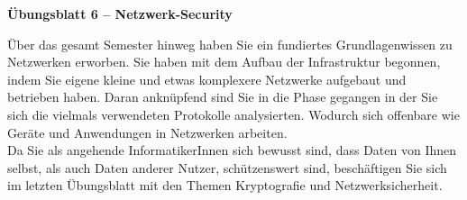 \documentclass[paper=a4,fontsize=11pt]{scrartcl}%
\begin{document}
\begin{center}
\Large{\textbf{Übungsblatt 6 -- Netzwerk-Security}}
\end{center}
Über das gesamt Semester hinweg haben Sie ein fundiertes Grundlagenwissen zu Netzwerken erworben. Sie haben mit dem Aufbau der Infrastruktur begonnen, indem Sie eigene kleine und etwas komplexere Netzwerke aufgebaut und betrieben haben. Daran anknüpfend sind Sie in die Phase gegangen in der Sie sich die vielmals verwendeten Protokolle analysierten. Wodurch sich offenbare wie Geräte und Anwendungen in Netzwerken arbeiten.\\
Da Sie als angehende InformatikerInnen sich bewusst sind, dass Daten von Ihnen selbst, als auch Daten anderer Nutzer, schützenswert sind, beschäftigen Sie sich im letzten Übungsblatt mit den Themen Kryptografie und Netzwerksicherheit.
\end{document}
